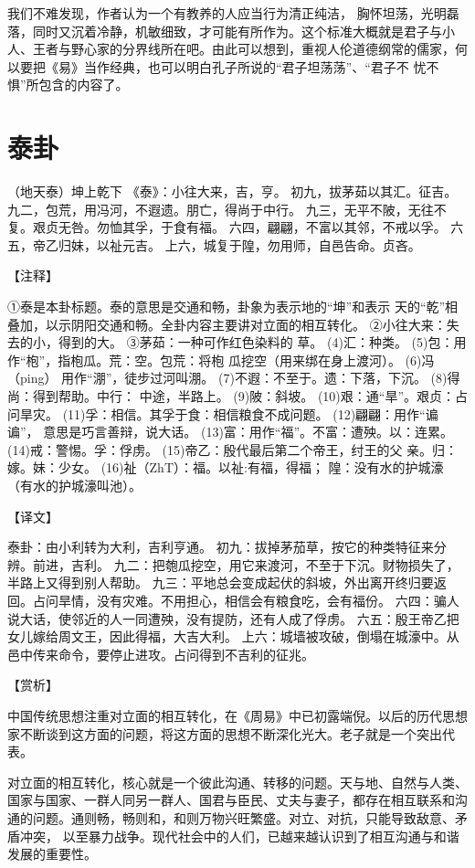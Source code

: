 \documentclass[12pt,UTF8]{ctexbook}
\begin{document}
我们不难发现，作者认为一个有教养的人应当行为清正纯洁， 胸怀坦荡，光明磊落，同时又沉着冷静，机敏细致，才可能有所作为。这个标准大概就是君子与小人、王者与野心家的分界线所在吧。由此可以想到，重视人伦道德纲常的儒家，何以要把《易》当作经典，也可以明白孔子所说的“君子坦荡荡”、“君子不 忧不惧”所包含的内容了。

\chapter{泰卦}

（地天泰）坤上乾下
《泰》：小往大来，吉，亨。
初九，拔茅茹以其汇。征吉。
九二，包荒，用冯河，不遐遗。朋亡，得尚于中行。
九三，无平不陂，无往不复。艰贞无咎。勿恤其孚，于食有福。
六四，翩翩，不富以其邻，不戒以孚。
六五，帝乙归妹，以祉元吉。
上六，城复于隍，勿用师，自邑告命。贞吝。

【注释】

①泰是本卦标题。泰的意思是交通和畅，卦象为表示地的“坤”和表示 天的“乾”相叠加，以示阴阳交通和畅。全卦内容主要讲对立面的相互转化。
②小往大来：失去的小，得到的大。
③茅茹：一种可作红色染料的 草。
(4)汇：种类。
(5)包：用作“枹”，指枹瓜。荒：空。包荒：将枹 瓜挖空（用来绑在身上渡河）。
(6)冯（ping） 用作“淜”，徒步过河叫淜。
(7)不遐：不至于。遗：下落，下沉。
(8)得尚：得到帮助。中行： 中途，半路上。
(9)陂：斜坡。
(10)艰：通“旱”。艰贞：占问旱灾。
(11)孚：相信。其孚于食：相信粮食不成问题。
(12)翩翩：用作“谝谝”， 意思是巧言善辩，说大话。
(13)富：用作“福”。不富：遭殃。以：连累。
(14)戒：警惕。孚：俘虏。
(15)帝乙：殷代最后第二个帝王，纣王的父 亲。归：嫁。妹：少女。
(16)祉（ZhT）：福。以祉:有福，得福； 隍：没有水的护城濠（有水的护城濠叫池）。

【译文】

泰卦：由小利转为大利，吉利亨通。
初九：拔掉茅茄草，按它的种类特征来分辨。前进，吉利。
九二：把匏瓜挖空，用它来渡河，不至于下沉。财物损失了， 半路上又得到别人帮助。
九三：平地总会变成起伏的斜坡，外出离开终归要返回。占问旱情，没有灾难。不用担心，相信会有粮食吃，会有福份。
六四：骗人说大话，使邻近的人一同遭殃，没有提防，还有人成了俘虏。
六五：殷王帝乙把女儿嫁给周文王，因此得福，大吉大利。
上六：城墙被攻破，倒塌在城濠中。从邑中传来命令，要停止进攻。占问得到不吉利的征兆。

【赏析】

中国传统思想注重对立面的相互转化，在《周易》中已初露端倪。以后的历代思想家不断谈到这方面的问题，将这方面的思想不断深化光大。老子就是一个突出代表。

对立面的相互转化，核心就是一个彼此沟通、转移的问题。天与地、自然与人类、国家与国家、一群人同另一群人、国君与臣民、丈夫与妻子，都存在相互联系和沟通的问题。通则畅，畅则和，和则万物兴旺繁盛。对立、对抗，只能导致敌意、矛盾冲突， 以至暴力战争。现代社会中的人们，已越来越认识到了相互沟通与和谐发展的重要性。
\end{document}
